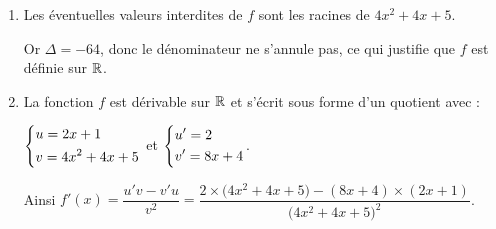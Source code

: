 \documentclass[a4paper,11pt]{article}
\begin{document}
\medskip


\begin{enumerate}
	\item Les éventuelles valeurs interdites de $f$ sont les racines de $4x^2+4x+5$.
	
	Or $\Delta=-64$, donc le dénominateur ne s'annule pas, ce qui justifie que $f$ est définie sur $\R$.
	\item La fonction $f$ est dérivable sur $\R$ et s'écrit sous forme d'un quotient avec :
	
	\tabula{}$\begin{dcases}u=2x+1 \\ v=4x^2+4x+5\end{dcases}$ et $\begin{dcases}u'=2 \\ v'=8x+4\end{dcases}$.
	
	Ainsi $f'(x)=\dfrac{u'v-v'u}{v^2}=\dfrac{2 \times \big(4x^2+4x+5\big)- (8x+4) \times (2x+1)}{\big(4x^2+4x+5\big)^2}$.
	

\end{enumerate}
\end{document}
